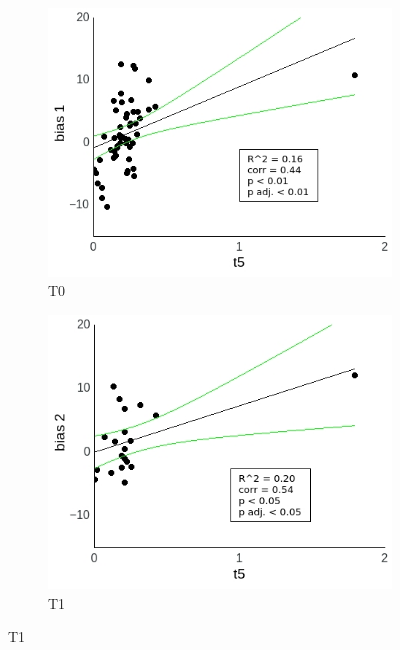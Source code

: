 \documentclass[a4paper]{scrreprt}
\begin{document}
\begin{figure}
\centering
\begin{subfigure}[b]{0.49\textwidth}
        \includegraphics[width=\textwidth]{figs/sec3/t5/t5_diff_1_mod2dat.jpeg}
        \caption{T0}
    \end{subfigure}
    \begin{subfigure}[b]{0.49\textwidth}
        \includegraphics[width=\textwidth]{figs/sec3/t5/t5_diff_2_mod2dat.jpeg}
        \caption{T1}
    \end{subfigure}


\end{figure}
\end{document}
